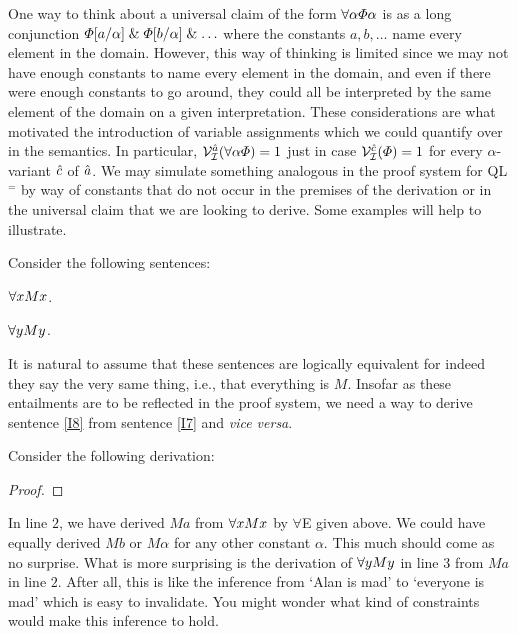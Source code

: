 One way to think about a universal claim of the form $\forall \alpha\varPhi\alpha$ is as a long conjunction $\varPhi[a/\alpha] \mathrel\& \varPhi[b/\alpha] \mathrel\&\ldots$ where the constants $a,b,\ldots$ name every element in the domain.
However, this way of thinking is limited since we may not have enough constants to name every element in the domain, and even if there were enough constants to go around, they could all be interpreted by the same element of the domain on a given interpretation.
These considerations are what motivated the introduction of variable assignments which we could quantify over in the semantics.
In particular, $\mathcal{V}_{\mathcal{I}}^{\hat{a}}(\forall\alpha\varPhi)=1$ just in case $\mathcal{V}_{\mathcal{I}}^{\hat{c}}(\varPhi)=1$ for every $\alpha$-variant $\hat{c}$ of $\hat{a}$.
We may simulate something analogous in the proof system for QL$^=$ by way of constants that do not occur in the premises of the derivation or in the universal claim that we are looking to derive.
Some examples will help to illustrate.

Consider the following sentences:

\begin{earg}
  \item[\ex{I7}] $\forall x Mx$.
  \item[\ex{I8}] $\forall y My$.
\end{earg}

It is natural to assume that these sentences are logically equivalent for indeed they say the very same thing, i.e., that everything is $M$.
Insofar as these entailments are to be reflected in the proof system, we need a way to derive sentence \ref{I8} from sentence \ref{I7} and \textit{vice versa}.

Consider the following derivation:

\begin{proof}
	 \pr{}
	 
	 
\end{proof}

In line $2$, we have derived $Ma$ from $\forall xMx$ by $\forall$E given above.
We could have equally derived $Mb$ or $M\alpha$ for any other constant $\alpha$.
This much should come as no surprise.
What is more surprising is the derivation of $\forall yMy$ in line $3$ from $Ma$ in line $2$.
After all, this is like the inference from `Alan is mad' to `everyone is mad' which is easy to invalidate.
You might wonder what kind of constraints would make this inference to hold.

